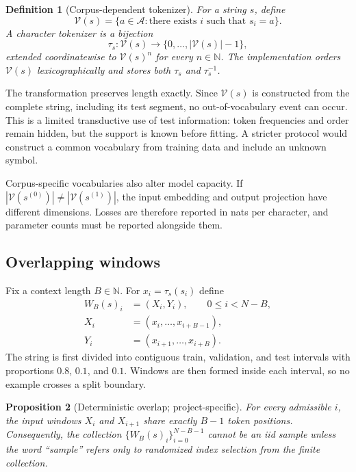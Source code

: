 \documentclass[11pt]{article}
\newtheorem{definition}{Definition}[section]
\newtheorem{proposition}[definition]{Proposition}
\newcommand{\A}{\mathcal A}
\newcommand{\V}{\mathcal V}
\newcommand{\N}{\mathbb N}
\newcommand{\1}{\mathbf 1}
\begin{document}
\begin{definition}[Corpus-dependent tokenizer]
For a string $s$, define
\[
 \V(s)=\{a\in\A:\text{there exists }i\text{ such that }s_i=a\}.
\]
A character tokenizer is a bijection
\[
 \tau_s:\V(s)\longrightarrow\{0,\ldots,|\V(s)|-1\},
\]
extended coordinatewise to $\V(s)^n$ for every $n\in\N$. The implementation
orders $\V(s)$ lexicographically and stores both $\tau_s$ and $\tau_s^{-1}$.
\end{definition}

The transformation preserves length exactly. Since $\V(s)$ is constructed
from the complete string, including its test segment, no out-of-vocabulary
event can occur. This is a limited transductive use of test information: token
frequencies and order remain hidden, but the support is known before fitting.
A stricter protocol would construct a common vocabulary from training data and
include an unknown symbol.

Corpus-specific vocabularies also alter model capacity. If
$|\V(s^{(0)})|\ne|\V(s^{(1)})|$, the input embedding and output projection have
different dimensions. Losses are therefore reported in nats per character,
and parameter counts must be reported alongside them.

\subsection{Overlapping windows}

Fix a context length $B\in\N$. For $x_i=\tau_s(s_i)$ define
\begin{align}
 W_B(s)_i&=(X_i,Y_i),\qquad 0\le i<N-B,\\
 X_i&=(x_i,\ldots,x_{i+B-1}),\\
 Y_i&=(x_{i+1},\ldots,x_{i+B}).
\end{align}
The string is first divided into contiguous train, validation, and test
intervals with proportions $0.8$, $0.1$, and $0.1$. Windows are then formed
inside each interval, so no example crosses a split boundary.

\begin{proposition}[Deterministic overlap; project-specific]
For every admissible $i$, the input windows $X_i$ and $X_{i+1}$ share exactly
$B-1$ token positions. Consequently, the collection
$\{W_B(s)_i\}_{i=0}^{N-B-1}$ cannot be an iid sample unless the word ``sample''
refers only to randomized index selection from the finite collection.
\end{proposition}
\end{document}
